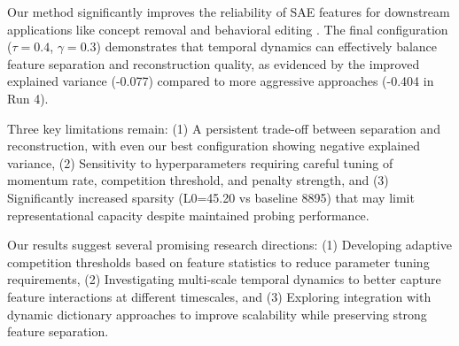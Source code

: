 \documentclass{article} %
\begin{document}
Our method significantly improves the reliability of SAE features for downstream applications like concept removal \cite{farrellApplyingSparseAutoencoders2024} and behavioral editing \cite{marksSparseFeatureCircuits2024}. The final configuration ($\tau=0.4$, $\gamma=0.3$) demonstrates that temporal dynamics can effectively balance feature separation and reconstruction quality, as evidenced by the improved explained variance (-0.077) compared to more aggressive approaches (-0.404 in Run 4).

Three key limitations remain: (1) A persistent trade-off between separation and reconstruction, with even our best configuration showing negative explained variance, (2) Sensitivity to hyperparameters requiring careful tuning of momentum rate, competition threshold, and penalty strength, and (3) Significantly increased sparsity (L0=45.20 vs baseline 8895) that may limit representational capacity despite maintained probing performance.

Our results suggest several promising research directions: (1) Developing adaptive competition thresholds based on feature statistics to reduce parameter tuning requirements, (2) Investigating multi-scale temporal dynamics to better capture feature interactions at different timescales, and (3) Exploring integration with dynamic dictionary approaches \cite{mudideEfficientDictionaryLearning2024a} to improve scalability while preserving strong feature separation.



\end{document}
